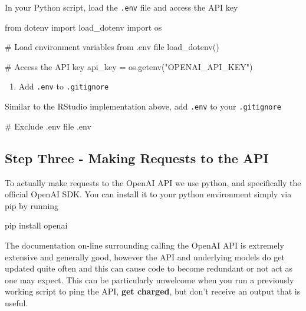 \documentclass[
  letterpaper,
  DIV=11,
  numbers=noendperiod]{scrreprt}
\newenvironment{Shaded}{\begin{snugshade}}{\end{snugshade}}
\newcommand{\CommentTok}[1]{\textcolor[rgb]{0.37,0.37,0.37}{#1}}
\newcommand{\ImportTok}[1]{\textcolor[rgb]{0.00,0.46,0.62}{#1}}
\newcommand{\NormalTok}[1]{\textcolor[rgb]{0.00,0.23,0.31}{#1}}
\newcommand{\OperatorTok}[1]{\textcolor[rgb]{0.37,0.37,0.37}{#1}}
\newcommand{\StringTok}[1]{\textcolor[rgb]{0.13,0.47,0.30}{#1}}
\providecommand{\tightlist}{%
  \setlength{\itemsep}{0pt}\setlength{\parskip}{0pt}}\usepackage{longtable,booktabs,array}
\begin{document}
In your Python script, load the \texttt{.env} file and access the API
key

\begin{Shaded}
\begin{Highlighting}[]
\ImportTok{from}\NormalTok{ dotenv }\ImportTok{import}\NormalTok{ load\_dotenv}
\ImportTok{import}\NormalTok{ os}

\CommentTok{\# Load environment variables from .env file}
\NormalTok{load\_dotenv()}

\CommentTok{\# Access the API key}
\NormalTok{api\_key }\OperatorTok{=}\NormalTok{ os.getenv(}\StringTok{"OPENAI\_API\_KEY"}\NormalTok{)}
\end{Highlighting}
\end{Shaded}

\begin{enumerate}
\def\labelenumi{\arabic{enumi}.}
\setcounter{enumi}{3}
\tightlist
\item
  Add \texttt{.env} to \texttt{.gitignore}
\end{enumerate}

Similar to the RStudio implementation above, add \texttt{.env} to your
\texttt{.gitignore}

\begin{Shaded}
\begin{Highlighting}[]
\CommentTok{\# Exclude .env file}
\NormalTok{.env}
\end{Highlighting}
\end{Shaded}

\subsection{Step Three - Making Requests to the
API}\label{step-three---making-requests-to-the-api}

To actually make requests to the OpenAI API we use python, and
specifically the official OpenAI SDK. You can install it to your python
environment simply via pip by running

\begin{Shaded}
\begin{Highlighting}[]
\NormalTok{pip install openai}
\end{Highlighting}
\end{Shaded}

The documentation on-line surrounding calling the OpenAI API is
extremely extensive and generally good, however the API and underlying
models do get updated quite often and this can cause code to become
redundant or not act as one may expect. This can be particularly
unwelcome when you run a previously working script to ping the API,
\textbf{get charged}, but don't receive an output that is useful.
\end{document}
